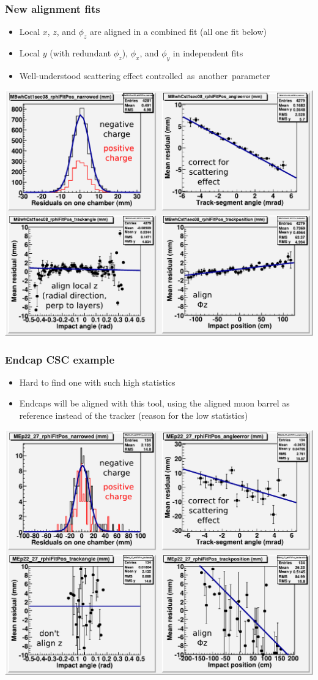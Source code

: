 \documentclass[compress]{beamer}
\begin{document}
\begin{frame}
\frametitle{New alignment fits}

\begin{itemize}
\item Local $x$, $z$, and $\phi_z$ are aligned in a combined fit (all one fit below)
\item Local $y$ (with redundant $\phi_z$), $\phi_x$, and $\phi_y$ in independent fits
\item Well-understood scattering effect \mbox{controlled as another parameter\hspace{-1 cm}}
\end{itemize}

\includegraphics[width=0.8\linewidth]{example_MBwhCst1sec08.pdf}

\end{frame}

\begin{frame}
\frametitle{Endcap CSC example}

\begin{itemize}
\item Hard to find one with such high statistics
\item Endcaps will be aligned with this tool, using the aligned muon barrel as reference instead of the tracker (reason for the low statistics)
\end{itemize}

\includegraphics[width=0.8\linewidth]{example_MEp22_27.pdf}
\end{frame}
\end{document}
